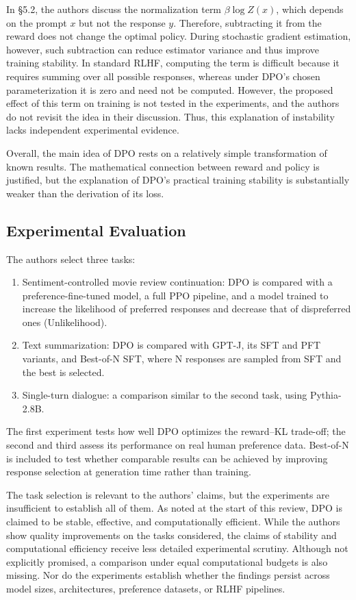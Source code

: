 \documentclass[11pt,a4paper]{article}
\theoremstyle{remark}
\begin{document}
In \S 5.2, the authors discuss the normalization term $\beta\log Z(x)$, which depends on the prompt $x$ but not the response $y$. Therefore, subtracting it from the reward does not change the optimal policy. During stochastic gradient estimation, however, such subtraction can reduce estimator variance and thus improve training stability. In standard RLHF, computing the term is difficult because it requires summing over all possible responses, whereas under DPO's chosen parameterization it is zero and need not be computed.
However, the proposed effect of this term on training is not tested in the experiments, and the authors do not revisit the idea in their discussion. Thus, this explanation of instability lacks independent experimental evidence.

Overall, the main idea of DPO rests on a relatively simple transformation of known results. The mathematical connection between reward and policy is justified, but the explanation of DPO's practical training stability is substantially weaker than the derivation of its loss.

\subsection{Experimental Evaluation}
The authors select three tasks:
\begin{enumerate}
    \item Sentiment-controlled movie review continuation: DPO is compared with a preference-fine-tuned model, a full PPO pipeline, and a model trained to increase the likelihood of preferred responses and decrease that of dispreferred ones (Unlikelihood).
    \item Text summarization: DPO is compared with GPT-J, its SFT and PFT variants, and Best-of-N SFT, where N responses are sampled from SFT and the best is selected.
    \item Single-turn dialogue: a comparison similar to the second task, using Pythia-2.8B.
\end{enumerate}
The first experiment tests how well DPO optimizes the reward--KL trade-off; the second and third assess its performance on real human preference data.
Best-of-N is included to test whether comparable results can be achieved by improving response selection at generation time rather than training.

The task selection is relevant to the authors' claims, but the experiments are insufficient to establish all of them. As noted at the start of this review, DPO is claimed to be stable, effective, and computationally efficient. While the authors show quality improvements on the tasks considered, the claims of stability and computational efficiency receive less detailed experimental scrutiny. Although not explicitly promised, a comparison under equal computational budgets is also missing. Nor do the experiments establish whether the findings persist across model sizes, architectures, preference datasets, or RLHF pipelines.
\end{document}
